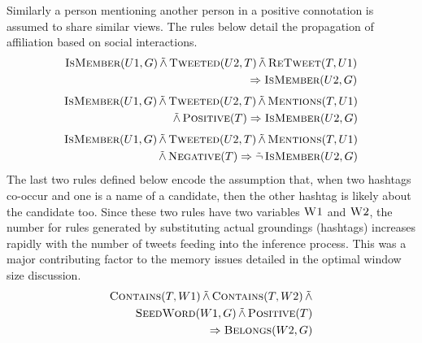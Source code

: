 Similarly a person mentioning another person in a positive connotation is assumed to share similar views.
The rules below detail the propagation of affiliation based on social interactions.
\begin{align*}
\begin{split}
\textsc{IsMember}(U1,G) 
	\softand \textsc{Tweeted}(U2,T)
	\softand \textsc{ReTweet}(T,U1)\\
	\Rightarrow \textsc{IsMember}(U2,G)
\end{split}
\end{align*}
\begin{align*}
\begin{split}
\textsc{IsMember}(U1,G) 
	\softand \textsc{Tweeted}(U2,T)
	\softand \textsc{Mentions}(T,U1)\\
	\softand \textsc{Positive}(T)
	\Rightarrow \textsc{IsMember}(U2,G)
\end{split}
\end{align*}
\begin{align*}
\begin{split}
\textsc{IsMember}(U1,G) 
	\softand \textsc{Tweeted}(U2,T)
	\softand \textsc{Mentions}(T,U1)\\
	\softand \textsc{Negative}(T)
	\Rightarrow \softneg \textsc{IsMember}(U2,G)
\end{split}
\end{align*}
The last two rules defined below encode the assumption that, when two hashtags co-occur and one is a name of a candidate, then the other hashtag is likely about the candidate too.
Since these two rules have two variables $\textsc{W1}$ and $\textsc{W2}$, the number for rules generated by substituting actual groundings (hashtags) increases rapidly with the number of tweets feeding into the inference process. 
This was a major contributing factor to the memory issues detailed in the optimal window size discussion.
\begin{align*}
\begin{split}
\textsc{Contains}(T,W1)
 \softand \textsc{Contains}(T,W2)
  \softand \\
   \textsc{SeedWord}(W1,G)
  \softand \textsc{Positive}(T) \\
	\Rightarrow \textsc{Belongs}(W2,G)
\end{split}
\end{align*}

